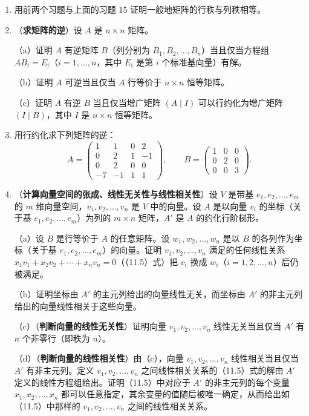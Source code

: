 \begin{enumerate}
（b）证明处于约化行阶梯形的矩阵的线性无关列个数等于线性无关行个数，即这样的矩阵的行秩与列秩相等。

\item 用前两个习题与上面的习题 15 证明一般地矩阵的行秩与列秩相等。

\item （\textbf{求矩阵的逆}）设 \(A\) 是 \(n \times n\) 矩阵。

（a）证明 \(A\) 有逆矩阵 \(B\)（列分别为 \(B_1, B_2, \ldots, B_n\)）当且仅当方程组 \(AB_i = E_i\)（\(i = 1, \ldots, n\)，其中 \(E_i\) 是第 \(i\) 个标准基向量）有解。

（b）证明 \(A\) 可逆当且仅当 \(A\) 行等价于 \(n \times n\) 恒等矩阵。

（c）证明 \(A\) 有逆 \(B\) 当且仅当增广矩阵 \((A \mid I)\) 可以行约化为增广矩阵 \((I \mid B)\)，其中 \(I\) 是 \(n \times n\) 恒等矩阵。

\item 用行约化求下列矩阵的逆：
\[
A = \begin{pmatrix} 1 & 1 & 0 & 2 \\ 0 & 2 & 1 & -1 \\ 0 & 2 & 0 & 0 \\ -7 & -1 & 1 & 1 \end{pmatrix}, \qquad B = \begin{pmatrix} 1 & 0 & 0 \\ 0 & 2 & 0 \\ 0 & 0 & 3 \end{pmatrix}.
\]

\item （\textbf{计算向量空间的张成、线性无关性与线性相关性}）设 \(V\) 是带基 \(e_1, e_2, \ldots, e_m\) 的 \(m\) 维向量空间，\(v_1, v_2, \ldots, v_n\) 是 \(V\) 中的向量。设 \(A\) 是以向量 \(v_i\) 的坐标（关于基 \(e_1, e_2, \ldots, e_m\)）为列的 \(m \times n\) 矩阵，\(A'\) 是 \(A\) 的约化行阶梯形。

（a）设 \(B\) 是行等价于 \(A\) 的任意矩阵。设 \(w_1, w_2, \ldots, w_n\) 是以 \(B\) 的各列作为坐标（关于基 \(e_1, e_2, \ldots, e_m\)）的向量。证明 \(v_1, v_2, \ldots, v_n\) 满足的任何线性关系 \(x_1v_1+x_2v_2+\cdots+x_nv_n = 0\)（（11.5）式）把 \(v_i\) 换成 \(w_i\)（\(i = 1, 2, \ldots, n\)）后仍被满足。

（b）证明坐标由 \(A'\) 的主元列给出的向量线性无关，而坐标由 \(A'\) 的非主元列给出的向量线性相关于这些向量。

（c）（\textbf{判断向量的线性无关性}）证明向量 \(v_1, v_2, \ldots, v_n\) 线性无关当且仅当 \(A'\) 有 \(n\) 个非零行（即秩为 \(n\)）。

（d）（\textbf{判断向量的线性相关性}）由（c），向量 \(v_1, v_2, \ldots, v_n\) 线性相关当且仅当 \(A'\) 有非主元列。定义 \(v_1, v_2, \ldots, v_n\) 之间线性相关关系的（11.5）式的解由 \(A'\) 定义的线性方程组给出。证明（11.5）中对应于 \(A'\) 的非主元列的每个变量 \(x_1, x_2, \ldots, x_n\) 都可以任意指定，其余变量的值随后被唯一确定，从而给出如（11.5）中那样的 \(v_1, v_2, \ldots, v_n\) 之间的线性相关关系。
\end{enumerate}

